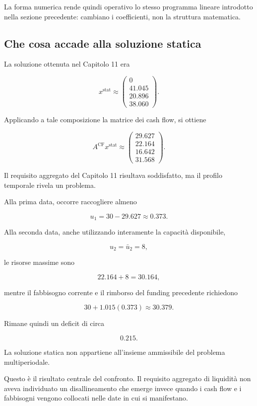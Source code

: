 La forma numerica rende quindi operativo lo stesso programma lineare
introdotto nella sezione precedente: cambiano i coefficienti, non la
struttura matematica.

\subsection{Che cosa accade alla soluzione statica}

La soluzione ottenuta nel Capitolo 11 era

\[
x^{\mathrm{stat}}
\approx
\begin{pmatrix}
0\\
41.045\\
20.896\\
38.060
\end{pmatrix}.
\]

Applicando a tale composizione la matrice dei cash flow, si ottiene

\[
A^{\mathrm{CF}}x^{\mathrm{stat}}
\approx
\begin{pmatrix}
29.627\\
22.164\\
16.642\\
31.568
\end{pmatrix}.
\]

Il requisito aggregato del Capitolo 11 risultava soddisfatto, ma il profilo
temporale rivela un problema.

Alla prima data, occorre raccogliere almeno

\[
u_1
=
30-29.627
\approx
0.373.
\]

Alla seconda data, anche utilizzando interamente la capacit\`a disponibile,

\[
u_2=\bar u_2=8,
\]

\noindent le risorse massime sono

\[
22.164+8
=
30.164,
\]

\noindent mentre il fabbisogno corrente e il rimborso del funding precedente richiedono

\[
30+1.015(0.373)
\approx
30.379.
\]

Rimane quindi un deficit di circa

\[
0.215.
\]

La soluzione statica non appartiene all'insieme ammissibile del problema
multiperiodale.

Questo \`e il risultato centrale del confronto. Il requisito aggregato di
liquidit\`a non aveva individuato un disallineamento che emerge invece quando
i cash flow e i fabbisogni vengono collocati nelle date in cui si
manifestano.

